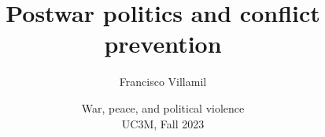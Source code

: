 \documentclass[aspectratio=43]{beamer}
\title{\huge Postwar politics and conflict prevention}
\author{Francisco Villamil}
\date{War, peace, and political violence\\UC3M, Fall 2023}
\begin{document}
\begin{frame}
  \titlepage
\end{frame}
\end{document}
